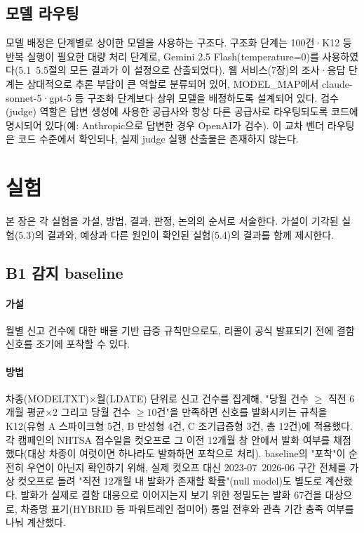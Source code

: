 \documentclass[11pt]{article}
\begin{document}
\subsection{모델 라우팅}

모델 배정은 단계별로 상이한 모델을 사용하는 구조다. 구조화 단계는 100건·K12 등 반복 실행이 필요한 대량 처리 단계로, Gemini 2.5 Flash(temperature=0)를 사용하였다(5.1~5.5절의 모든 결과가 이 설정으로 산출되었다).
웹 서비스(7장)의 조사·응답 단계는 상대적으로 추론 부담이 큰 역할로 분류되어 있어, MODEL\_MAP에서 claude-sonnet-5·gpt-5 등 구조화 단계보다 상위 모델을 배정하도록 설계되어 있다. 검수(judge) 역할은 답변 생성에 사용한 공급사와 항상 다른 공급사로 라우팅되도록 코드에 명시되어 있다(예: Anthropic으로 답변한 경우 OpenAI가 검수). 이 교차 벤더 라우팅은 코드 수준에서 확인되나, 실제 judge 실행 산출물은 존재하지 않는다.

\section{실험}

본 장은 각 실험을 가설, 방법, 결과, 판정, 논의의 순서로 서술한다. 가설이 기각된 실험(5.3)의 결과와, 예상과 다른 원인이 확인된 실험(5.4)의 결과를 함께 제시한다.

\subsection{B1 감지 baseline}

\paragraph{가설} 월별 신고 건수에 대한 배율 기반 급증 규칙만으로도, 리콜이 공식 발표되기 전에 결함 신호를 조기에 포착할 수 있다.

\paragraph{방법} 차종(MODELTXT)×월(LDATE) 단위로 신고 건수를 집계해, "당월 건수 $\geq$ 직전 6개월 평균$\times 2$ 그리고 당월 건수 $\geq 10$건"을 만족하면 신호를 발화시키는 규칙을 K12(유형 A 스파이크형 5건, B 만성형 4건, C 조기급증형 3건, 총 12건)에 적용했다. 각 캠페인의 NHTSA 접수일을 컷오프로 그 이전 12개월 창 안에서 발화 여부를 채점했다(대상 차종이 여럿이면 하나라도 발화하면 포착으로 처리). baseline의 "포착"이 순전히 우연이 아닌지 확인하기 위해, 실제 컷오프 대신 2023-07~2026-06 구간 전체를 가상 컷오프로 돌려 "직전 12개월 내 발화가 존재할 확률"(null model)도 별도로 계산했다. 발화가 실제로 결함 대응으로 이어지는지 보기 위한 정밀도는 발화 67건을 대상으로, 차종명 표기(HYBRID 등 파워트레인 접미어) 통일 전후와 관측 기간 충족 여부를 나눠 계산했다.
\end{document}
